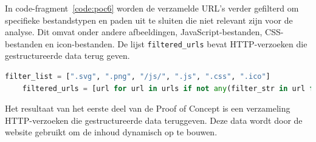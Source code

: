 In code-fragment~\ref{code:poc6} worden de verzamelde URL's verder gefilterd om specifieke bestandstypen en paden uit te sluiten die niet relevant zijn voor de analyse. Dit omvat onder andere afbeeldingen, JavaScript-bestanden, CSS-bestanden en icon-bestanden. De lijst \texttt{filtered\_urls} bevat HTTP-verzoeken die gestructureerde data terug geven.
\begin{lstlisting}[language=python, captionpos=b, caption={Ongewenste bestanden filteren}, label={code:poc6}]
    filter_list = [".svg", ".png", "/js/", ".js", ".css", ".ico"]
    filtered_urls = [url for url in urls if not any(filter_str in url for filter_str in filter_list)]
\end{lstlisting}

Het resultaat van het eerste deel van de Proof of Concept is een verzameling HTTP-verzoeken die gestructureerde data teruggeven. Deze data wordt door de website gebruikt om de inhoud dynamisch op te bouwen.

